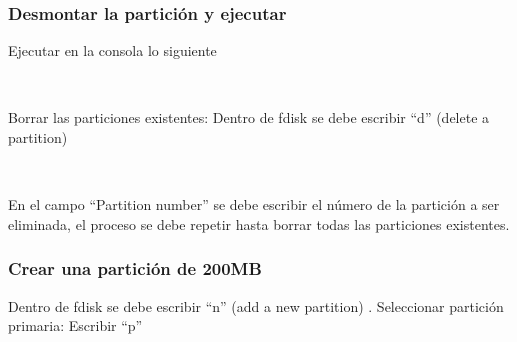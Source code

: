 \documentclass[12pt]{article}
\begin{document}
\subsubsection{Desmontar la partición y ejecutar }
\noindent
Ejecutar en la consola lo siguiente
\begin{center}
 \\
\end{center}
\noindent
Borrar las particiones existentes: Dentro de fdisk se debe escribir ``d'' (delete a partition)
\begin{center}
 \\
\end{center}
\noindent
En el campo ``Partition number'' se debe escribir el número de la partición a ser eliminada, el proceso se debe repetir hasta borrar todas las particiones existentes.

\subsubsection{Crear una partición de 200MB}
\noindent
Dentro de fdisk se debe escribir ``n'' (add a new partition) . Seleccionar partición primaria: Escribir ``p''
\begin{center}
 \\
 \\
 \\
 \\
 \\
 \\
 \\
\end{center}
\end{document}
